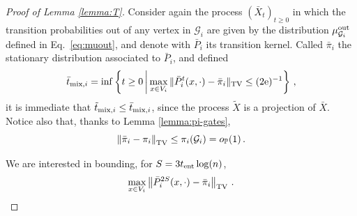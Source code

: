 \documentclass[11pt,oneside]{amsart}
\numberwithin{equation}{section}  %
\theoremstyle{plain}
\newcommand{\p}{\mathbb{P}}
\newcommand{\op}{o_{\p}}
\newcommand{\tent}{t_{\textup{ent}}}
\newcommand{\gates}{\mathcal{G}}
\newcommand{\muout}{\mu^{\rm out}_{\gates_i}}
\begin{document}
\begin{proof}[Proof of Lemma \ref{lemma:T}] Consider again the process $(\bar X_t)_{t\ge 0}$ in which the transition probabilities out of any vertex in $\gates_i$ are given by the distribution $\muout$ defined in Eq.~\eqref{eq:muout}, and denote with $\bar P_i$ its transition kernel.
Called $\bar\pi_i$ the stationary distribution associated to $\bar P_i$, and defined
	\begin{equation}\label{eq:def-bar-tmix}
		\bar{t}_{{\rm mix},i}= \inf\left\{t\ge 0\,\bigg\rvert \max_{x\in  V_i}\|\bar{P}_i^t(x,\cdot)-\bar{\pi}_i \|_{\rm TV}\le  (2{\rm e})^{-1} \right\}\,,
	\end{equation}
	it is immediate that $\tilde{t}_{{\rm mix},i}\le \bar{t}_{{\rm mix},i}$, since the process $\tilde X$ is a projection of $\bar X$. Notice also that, thanks to Lemma \ref{lemma:pi-gates},
	\begin{equation}\label{eq:pi-pibar}
		\left\|\bar{\pi}_i-\pi_i\right\|_{\rm TV}\le \pi_i(\gates_i)=\op(1)\,.
	\end{equation}
	
We are interested in bounding, for ${S}=3\tent\log(n)$,
\begin{equation}\label{eq:mix1}
	\max_{x \in V_i}\left\|\bar{P}_i^{2S}(x,\cdot)-\bar\pi_i\right\|_{\rm TV}\,.
\end{equation}


\end{proof}
\end{document}
